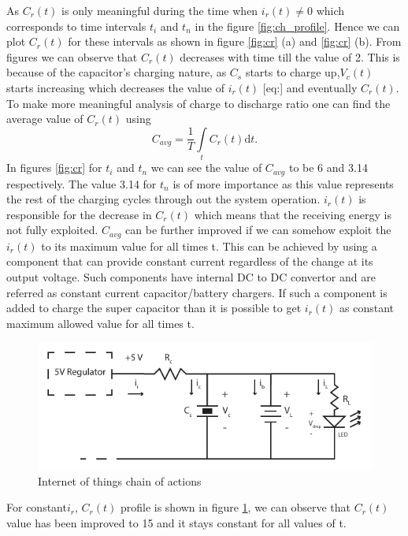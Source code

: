 As $C_r(t)$ is only meaningful during the time when $i_r(t) \neq 0$ which corresponds to time intervals $t_i$ and $t_n$ in the figure \ref{fig:ch_profile}. Hence we can plot $C_r(t)$ for these intervals as shown in figure \ref{fig:cr} (a) and \ref{fig:cr} (b). From figures we can observe that $ C_r(t)$ decreases with time till the value of 2. This is because of the capacitor's charging nature, as $C_s$ starts to charge up,$ V_c(t)$ starts increasing which decreases the value of $ i_r(t)$ [eq:\cite{eq:ir}] and eventually $C_r(t)$. 
To make more meaningful analysis of charge to discharge ratio one can find the average value of $C_r(t)$ using
\begin{equation}\label{eq:cravg}
C_{avg} = \frac{1}{T}\int\limits_t C_r(t) \mathrm{d}t.
\end{equation}
In figures \ref{fig:cr} for $t_i$ and $t_n$ we can see the value of $ C_{avg}$ to be 6 and 3.14 respectively. The value 3.14 for $t_n$ is of more importance as this value represents the rest of the charging cycles through out the system operation. $i_r(t)$ is responsible for the decrease in $C_r(t)$ which means that the receiving energy is not fully exploited. $C_{avg}$ can be further improved if we can somehow exploit the $i_r(t)$ to its maximum value for all times t. This can be achieved by using a component that can provide constant current regardless of the change at its output voltage. Such components have internal DC to DC convertor and are referred as constant current capacitor/battery chargers. If such a component is added to charge the super capacitor than it is possible to get $i_r(t)$ as constant maximum allowed value for all times t.


\begin{figure}[h!]
\centering
\includegraphics[width=1\textwidth]{rec_design.pdf}
\caption{Internet of things chain of actions}
\label{fig:crconst}
\end{figure}

 For constant$ i_r$, $C_r(t)$ profile is shown in figure \ref{fig:crconst}, we can observe that $C_r(t)$ value has been improved to 15 and it stays constant for all values of t.
